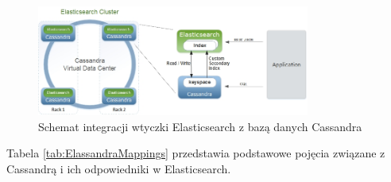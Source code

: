 \begin{figure}[!ht]
\centering
\includegraphics[width=0.8\textwidth]{figures/elassandra1.jpg}
\caption{Schemat integracji wtyczki Elasticsearch z bazą danych Cassandra \cite{ElassandraRepo}}
\label{fig:elassandraSchema}
\end{figure}

Tabela \ref{tab:ElassandraMappings} przedstawia podstawowe pojęcia związane z Cassandrą i ich odpowiedniki w Elasticsearch.

